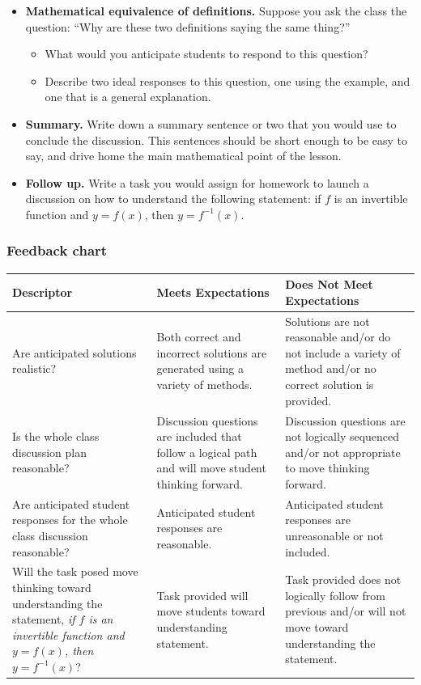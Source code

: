 \documentclass[11pt]{article}
\theoremstyle{definition}
\begin{document}
\begin{itemize}
\begin{itemize}
		\end{itemize}
	\item {\bf Mathematical equivalence of definitions.} Suppose you ask the class the question: ``Why are these two definitions saying the same thing?'' 
		\begin{itemize}
		\item What would you anticipate students to respond to this question?
		\item Describe two ideal responses to this question, one using the example, and one that is a general explanation.
		\end{itemize}
	\item {\bf Summary.} Write down a summary sentence or two that you would use to conclude the discussion. This sentences should be short enough to be easy to say, and drive home the main mathematical point of the lesson.
	\item {\bf Follow up.} Write a task you would assign for homework to launch a discussion on how to understand the following statement: if $f$ is an invertible function and $y=f(x)$, then $y=f^{-1}(x)$.
	\end{itemize}
	
\newpage

\subsubsection*{Feedback chart}

\begin{center}
\begin{tabular}{|L{2in}|L{2in}|L{2in}|}
\hline
{\bf Descriptor} & {\bf Meets Expectations} & {\bf Does Not Meet Expectations} \\ \hline
Are anticipated solutions realistic?	
& Both correct and incorrect solutions are generated using a variety of methods.	
& Solutions are not reasonable and/or do not include a variety of method and/or no correct solution is provided. \\ \hline
Is the whole class discussion plan reasonable? &	Discussion questions are included that follow a logical path and will move student thinking forward.&	Discussion questions are not logically sequenced and/or not appropriate to move thinking forward. 
\\ \hline
Are anticipated student responses for the whole class discussion reasonable?	& Anticipated student responses are reasonable. &	Anticipated student responses are unreasonable or not included.
\\ \hline
Will the task posed move thinking toward understanding the statement, {\it if $f$ is an invertible function and $y=f(x)$, then $y=f^{-1}(x)$}? &	Task provided will move students toward understanding statement.	
& Task provided does not logically follow from previous and/or will not move toward understanding the statement. 
\\ \hline
\end{tabular}
\end{center}
\end{document}

